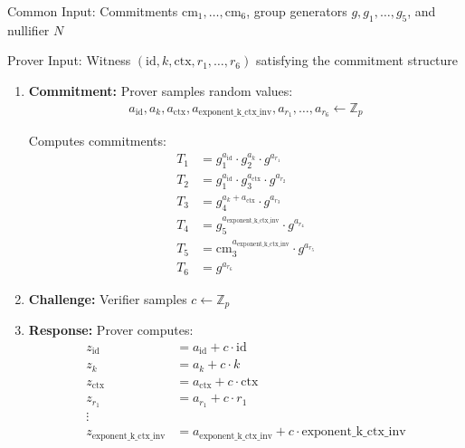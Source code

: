 \begin{protocol}
Common Input: Commitments $\text{cm}_1, \ldots, \text{cm}_6$, group generators $g, g_1, \ldots, g_5$, and nullifier $N$

Prover Input: Witness $(\text{id}, k, \text{ctx}, r_1, \ldots, r_6)$ satisfying the commitment structure

\begin{enumerate}
    \item \textbf{Commitment:} Prover samples random values:
    \begin{align}
        a_{\text{id}}, a_{k}, a_{\text{ctx}}, a_{\text{exponent\_k\_ctx\_inv}}, a_{r_1}, \ldots, a_{r_6} \leftarrow \mathbb{Z}_p
    \end{align}
    
    Computes commitments:
    \begin{align}
        T_1 &= g_1^{a_{\text{id}}} \cdot g_2^{a_{k}} \cdot g^{a_{r_1}} \\
        T_2 &= g_1^{a_{\text{id}}} \cdot g_3^{a_{\text{ctx}}} \cdot g^{a_{r_2}} \\
        T_3 &= g_4^{a_{k} + a_{\text{ctx}}} \cdot g^{a_{r_3}} \\
        T_4 &= g_5^{a_{\text{exponent\_k\_ctx\_inv}}} \cdot g^{a_{r_4}} \\
        T_5 &= \text{cm}_3^{a_{\text{exponent\_k\_ctx\_inv}}} \cdot g^{a_{r_5}} \\
        T_6 &= g^{a_{r_6}}
    \end{align}
    
    \item \textbf{Challenge:} Verifier samples $c \leftarrow \mathbb{Z}_p$
    
    \item \textbf{Response:} Prover computes:
    \begin{align}
        z_{\text{id}} &= a_{\text{id}} + c \cdot \text{id} \\
        z_{k} &= a_{k} + c \cdot k \\
        z_{\text{ctx}} &= a_{\text{ctx}} + c \cdot \text{ctx} \\
        z_{r_1} &= a_{r_1} + c \cdot r_1 \\
        \vdots \\
        z_{\text{exponent\_k\_ctx\_inv}} &= a_{\text{exponent\_k\_ctx\_inv}} + c \cdot \text{exponent\_k\_ctx\_inv}
    \end{align}
    

\end{enumerate}
\end{protocol}
